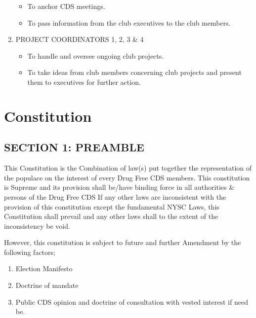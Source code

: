 \documentclass{report}
\begin{document}
\begin{enumerate}
\begin{itemize}
    \item 
    To anchor CDS meetings.
    
    \item 
    To pass information from the club executives to the club members.

\end{itemize}

    \item PROJECT COORDINATORS 1, 2, 3 \& 4
        \begin{itemize}
    \item 
    To handle and oversee ongoing club projects.
    
    \item 
    To take ideas from club members concerning club projects and present them to executives for further action.
    
\end{itemize}


\end{enumerate}

\chapter{Constitution}
\section{SECTION 1: PREAMBLE}
This Constitution is the Combination of law(s) put together the representation of the populace on the interest of every Drug Free CDS members. This constitution is Supreme and its provision shall be/have binding force in all authorities & persons of the Drug Free CDS If any other laws are inconsistent with the provision of this constitution except the fundamental NYSC Laws, this Constitution shall prevail and any other laws shall to the extent of the inconsistency be void.

However, this constitution is subject to future and further Amendment by the following factors; 
\begin{enumerate}
    \item Election Manifesto
    
    \item Doctrine of mandate
     
    \item Public CDS opinion and doctrine of consultation with vested interest if need be.
\end{enumerate}
\end{document}
